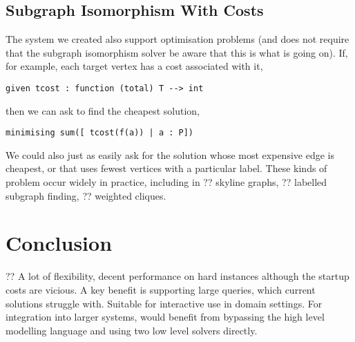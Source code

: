 \documentclass[runningheads]{llncs}
\begin{document}
\subsection{Subgraph Isomorphism With Costs}

The system we created also support optimisation problems (and does not require that the subgraph
isomorphism solver be aware that this is what is going on). If, for example, each target vertex has
a cost associated with it,
\begin{lstlisting}
given tcost : function (total) T --> int
\end{lstlisting}
then we can ask to find the cheapest solution,
\begin{lstlisting}
minimising sum([ tcost(f(a)) | a : P])
\end{lstlisting}
We could also just as easily ask for the solution whose most expensive edge is cheapest, or that
uses fewest vertices with a particular label. These kinds of problem occur widely in practice,
including in ?? skyline graphs, ?? labelled subgraph finding, ?? weighted cliques.

\section{Conclusion}

?? A lot of flexibility, decent performance on hard instances although the startup costs are
vicious. A key benefit is supporting large queries, which current solutions struggle with. Suitable
for interactive use in domain settings. For integration into larger systems, would benefit from
bypassing the high level modelling language and using two low level solvers directly.



\end{document}
